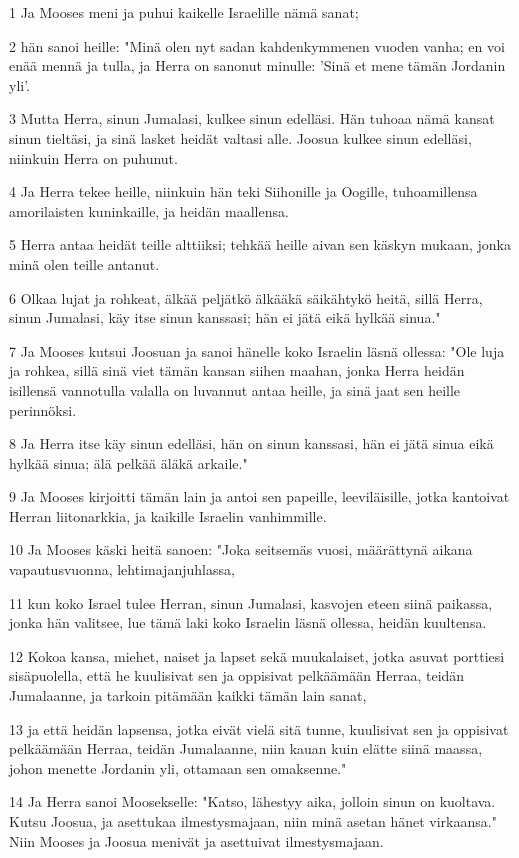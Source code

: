 \par 1 Ja Mooses meni ja puhui kaikelle Israelille nämä sanat;
\par 2 hän sanoi heille: "Minä olen nyt sadan kahdenkymmenen vuoden vanha; en voi enää mennä ja tulla, ja Herra on sanonut minulle: 'Sinä et mene tämän Jordanin yli'.
\par 3 Mutta Herra, sinun Jumalasi, kulkee sinun edelläsi. Hän tuhoaa nämä kansat sinun tieltäsi, ja sinä lasket heidät valtasi alle. Joosua kulkee sinun edelläsi, niinkuin Herra on puhunut.
\par 4 Ja Herra tekee heille, niinkuin hän teki Siihonille ja Oogille, tuhoamillensa amorilaisten kuninkaille, ja heidän maallensa.
\par 5 Herra antaa heidät teille alttiiksi; tehkää heille aivan sen käskyn mukaan, jonka minä olen teille antanut.
\par 6 Olkaa lujat ja rohkeat, älkää peljätkö älkääkä säikähtykö heitä, sillä Herra, sinun Jumalasi, käy itse sinun kanssasi; hän ei jätä eikä hylkää sinua."
\par 7 Ja Mooses kutsui Joosuan ja sanoi hänelle koko Israelin läsnä ollessa: "Ole luja ja rohkea, sillä sinä viet tämän kansan siihen maahan, jonka Herra heidän isillensä vannotulla valalla on luvannut antaa heille, ja sinä jaat sen heille perinnöksi.
\par 8 Ja Herra itse käy sinun edelläsi, hän on sinun kanssasi, hän ei jätä sinua eikä hylkää sinua; älä pelkää äläkä arkaile."
\par 9 Ja Mooses kirjoitti tämän lain ja antoi sen papeille, leeviläisille, jotka kantoivat Herran liitonarkkia, ja kaikille Israelin vanhimmille.
\par 10 Ja Mooses käski heitä sanoen: "Joka seitsemäs vuosi, määrättynä aikana vapautusvuonna, lehtimajanjuhlassa,
\par 11 kun koko Israel tulee Herran, sinun Jumalasi, kasvojen eteen siinä paikassa, jonka hän valitsee, lue tämä laki koko Israelin läsnä ollessa, heidän kuultensa.
\par 12 Kokoa kansa, miehet, naiset ja lapset sekä muukalaiset, jotka asuvat porttiesi sisäpuolella, että he kuulisivat sen ja oppisivat pelkäämään Herraa, teidän Jumalaanne, ja tarkoin pitämään kaikki tämän lain sanat,
\par 13 ja että heidän lapsensa, jotka eivät vielä sitä tunne, kuulisivat sen ja oppisivat pelkäämään Herraa, teidän Jumalaanne, niin kauan kuin elätte siinä maassa, johon menette Jordanin yli, ottamaan sen omaksenne."
\par 14 Ja Herra sanoi Moosekselle: "Katso, lähestyy aika, jolloin sinun on kuoltava. Kutsu Joosua, ja asettukaa ilmestysmajaan, niin minä asetan hänet virkaansa." Niin Mooses ja Joosua menivät ja asettuivat ilmestysmajaan.
